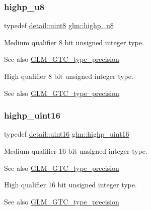 \subsubsection{\texorpdfstring{highp\+\_\+u8}{highp\_u8}}
{\footnotesize\ttfamily typedef \hyperlink{namespaceglm_1_1detail_aef2588f97d090cc19fbbe0c74fe17c8f}{detail\+::uint8} \hyperlink{group__gtc__type__precision_ga8a60abe782749c504fb5ae51eb8b49cc}{glm\+::highp\+\_\+u8}}

Medium qualifier 8 bit unsigned integer type. \begin{DoxySeeAlso}{See also}
\hyperlink{group__gtc__type__precision}{G\+L\+M\+\_\+\+G\+T\+C\+\_\+type\+\_\+precision}
\end{DoxySeeAlso}
High qualifier 8 bit unsigned integer type. \begin{DoxySeeAlso}{See also}
\hyperlink{group__gtc__type__precision}{G\+L\+M\+\_\+\+G\+T\+C\+\_\+type\+\_\+precision} 
\end{DoxySeeAlso}
\mbox{\label{group__gtc__type__precision_ga4d32967d45ba8365e2a05eaaac85e978}} 
\subsubsection{\texorpdfstring{highp\+\_\+uint16}{highp\_uint16}}
{\footnotesize\ttfamily typedef \hyperlink{namespaceglm_1_1detail_a47b2a7d006d187338e8031a352d1ce56}{detail\+::uint16} \hyperlink{group__gtc__type__precision_ga4d32967d45ba8365e2a05eaaac85e978}{glm\+::highp\+\_\+uint16}}

Medium qualifier 16 bit unsigned integer type. \begin{DoxySeeAlso}{See also}
\hyperlink{group__gtc__type__precision}{G\+L\+M\+\_\+\+G\+T\+C\+\_\+type\+\_\+precision}
\end{DoxySeeAlso}
High qualifier 16 bit unsigned integer type. \begin{DoxySeeAlso}{See also}
\hyperlink{group__gtc__type__precision}{G\+L\+M\+\_\+\+G\+T\+C\+\_\+type\+\_\+precision} 
\end{DoxySeeAlso}
\mbox{\label{group__gtc__type__precision_ga3145bc0ee80432c165e985a188a722b3}} 
